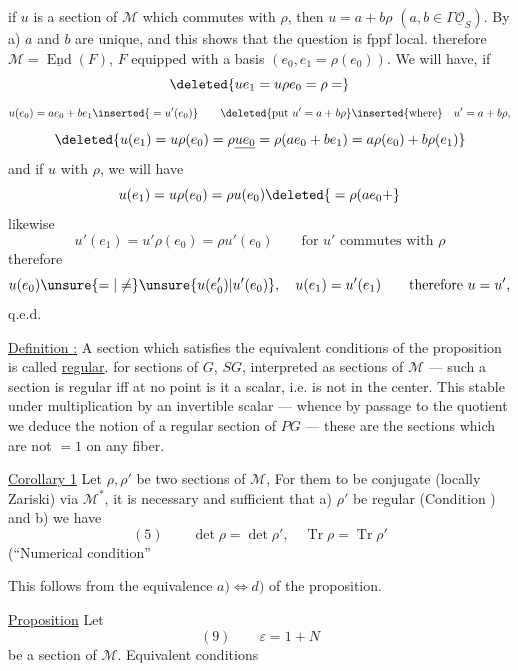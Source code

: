 

if $u$ is a section of $\mathcal M$  which commutes with $\rho$, then $u=a+b\rho$ $(a,b\in\Gamma\underline{\mathcal O}_S)$. By a) $a$ and $b$ are unique, and this shows that the question is fppf local.  therefore $\mathcal M=\underline{\operatorname{End}}(F)$, $F$ equipped with a basis $(e_0,e_1=\rho(e_0))$.  We will have, if
\[
\deleted{ue_1=u\rho e_0=\rho=}
\]
\[
u(e_0)=ae_0+be_1\inserted{{}=u'(e_0)}\qquad
\deleted{\text{put }u'=a+b\rho}\inserted{\text{where}}\quad u'=a+b\rho,
\]
\[
\deleted{u(e_1)=u\rho(e_0)=\rho\underline{ue_0}=\rho(ae_0+be_1)=a\rho(e_0)+b\rho(e_1)}
\]
and if $u$   with $\rho$, we will have
\[
u(e_1)=u\rho(e_0)=\rho u(e_0)\deleted{{}=\rho(ae_0+}
\]
likewise
\[
u'(e_1)=u'\rho(e_0)=\rho u'(e_0)\qquad\text{for }u'\text{ commutes with }\rho
\]
therefore
\[
u(e_0)\unsure{=|\neq}\unsure{u(e'_0)|u'(e_0)},\quad u(e_1)=u'(e_1)\qquad\text{therefore }u=u',
\]
q.e.d.

\uline{Definition :} A section  which satisfies the equivalent conditions of the proposition is called \uline{regular}.  for sections of $G$, $SG$, interpreted as sections of $\mathcal M$ ---  such a section is regular iff at no point is it a scalar, i.e. is not in the center. This  stable under multiplication by an invertible scalar --- whence by passage to the quotient we deduce the notion of a regular section of $PG$ --- these are the sections which are not $=1$ on any fiber.

\uline{Corollary 1} Let $\rho,\rho'$ be two  sections of $\mathcal M$,  For them to be conjugate (locally Zariski) via $\mathcal M^*$, it is necessary and sufficient that \deleted{$\rho$} a) $\rho'$ be regular (Condition  ) and b) we have
\[
(5)\qquad \det\rho=\det\rho',\quad \operatorname{Tr}\rho=\operatorname{Tr}\rho'
\]
(``Numerical condition''



This follows from the equivalence $a)\Longleftrightarrow d)$ of the proposition.

\uline{Proposition} Let
\[
(9)\qquad \varepsilon=1+N
\]
be a section of $\mathcal M$. Equivalent conditions

